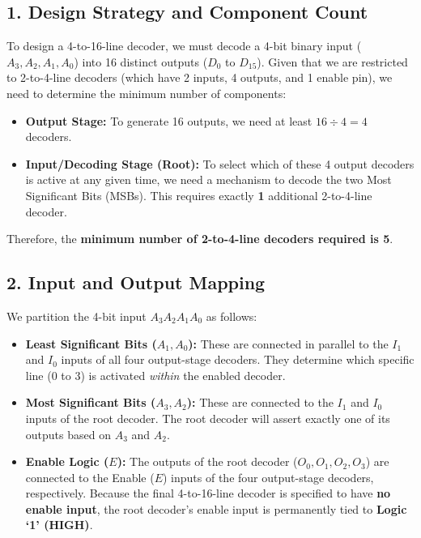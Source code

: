 \documentclass[12pt,a3paper]{article}
\begin{document}
\begin{enumerate}
\begin{tcolorbox}[enhanced,breakable,ansbox,colback=cD!4,colframe=cD,boxrule=0.8pt,arc=5pt,title={\textbf{Answer}},fonttitle=\bfseries\color{white},colbacktitle=cD]
\subsection*{1. Design Strategy and Component Count}
To design a 4-to-16-line decoder, we must decode a 4-bit binary input ($A_3, A_2, A_1, A_0$) into 16 distinct outputs ($D_0$ to $D_{15}$). 
Given that we are restricted to 2-to-4-line decoders (which have 2 inputs, 4 outputs, and 1 enable pin), we need to determine the minimum number of components:
\begin{itemize}
    \item \textbf{Output Stage:} To generate 16 outputs, we need at least $16 \div 4 = 4$ decoders.
    \item \textbf{Input/Decoding Stage (Root):} To select which of these 4 output decoders is active at any given time, we need a mechanism to decode the two Most Significant Bits (MSBs). This requires exactly \textbf{1} additional 2-to-4-line decoder.
\end{itemize}
Therefore, the \textbf{minimum number of 2-to-4-line decoders required is 5}.

\subsection*{2. Input and Output Mapping}
We partition the 4-bit input $A_3 A_2 A_1 A_0$ as follows:
\begin{itemize}
    \item \textbf{Least Significant Bits ($A_1, A_0$):} These are connected in parallel to the $I_1$ and $I_0$ inputs of all four output-stage decoders. They determine which specific line (0 to 3) is activated \textit{within} the enabled decoder.
    \item \textbf{Most Significant Bits ($A_3, A_2$):} These are connected to the $I_1$ and $I_0$ inputs of the root decoder. The root decoder will assert exactly one of its outputs based on $A_3$ and $A_2$.
    \item \textbf{Enable Logic ($E$):} The outputs of the root decoder ($O_0, O_1, O_2, O_3$) are connected to the Enable ($E$) inputs of the four output-stage decoders, respectively. Because the final 4-to-16-line decoder is specified to have \textbf{no enable input}, the root decoder's enable input is permanently tied to \textcolor{cD}{\textbf{Logic `1' (HIGH)}}.
\end{itemize}


\end{tcolorbox}
\end{enumerate}
\end{document}
